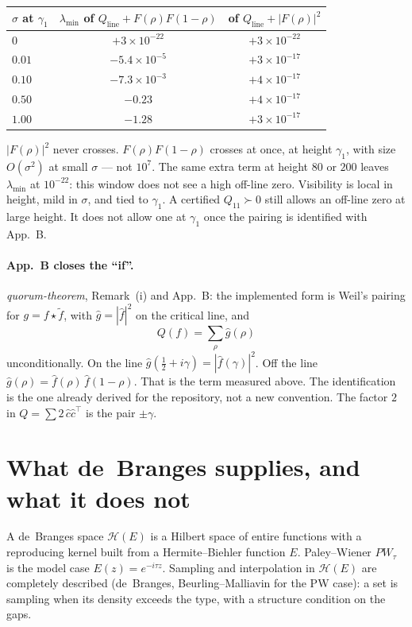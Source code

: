\documentclass[11pt]{article}
\theoremstyle{remark}\newtheorem*{remark}{Remark}
\begin{document}
\begin{center}\small
\begin{tabular}{lcc}\toprule
$\sigma$ at $\gamma_1$ & $\lambda_{\min}$ of $Q_{\mathrm{line}}+F(\rho)F(1-\rho)$
  & of $Q_{\mathrm{line}}+|F(\rho)|^2$\\
\midrule
$0$ & $+3\times10^{-22}$ & $+3\times10^{-22}$\\
$0.01$ & $-5.4\times10^{-5}$ & $+3\times10^{-17}$\\
$0.10$ & $-7.3\times10^{-3}$ & $+4\times10^{-17}$\\
$0.50$ & $-0.23$ & $+4\times10^{-17}$\\
$1.00$ & $-1.28$ & $+3\times10^{-17}$\\
\bottomrule
\end{tabular}
\end{center}
$|F(\rho)|^2$ never crosses. $F(\rho)F(1-\rho)$ crosses at once, at
height $\gamma_1$, with size $O(\sigma^2)$ at small $\sigma$ --- not
$10^7$. The same extra term at height $80$ or $200$ leaves
$\lambda_{\min}$ at $10^{-22}$: this window does not see a high
off-line zero. Visibility is local in height, mild in $\sigma$, and
tied to $\gamma_1$. A certified $Q_{11}\succ0$ still allows an off-line
zero at large height. It does not allow one at $\gamma_1$ once the
pairing is identified with App.~B.

\paragraph{App.~B closes the ``if''.}
\emph{quorum-theorem}, Remark~(i) and App.~B: the implemented form is
Weil's pairing for $g=f\star\tilde f$, with $\hat g=|\hat f|^2$ on the
critical line, and
\[
Q(f)=\sum_\rho\hat g(\rho)
\]
unconditionally. On the line $\hat g(\tfrac12+i\gamma)=|\hat f(\gamma)|^2$.
Off the line $\hat g(\rho)=\hat f(\rho)\,\hat f(1-\rho)$. That is the
term measured above. The identification is the one already derived
for the repository, not a new convention. The factor $2$ in
$Q=\sum 2\,\hat c\hat c^\top$ is the pair $\pm\gamma$.

\section{What de~Branges supplies, and what it does not}
A de~Branges space $\mathcal{H}(E)$ is a Hilbert space of entire
functions with a reproducing kernel built from a Hermite--Biehler
function $E$. Paley--Wiener $PW_\tau$ is the model case
$E(z)=e^{-i\tau z}$. Sampling and interpolation in $\mathcal{H}(E)$ are
completely described (de~Branges, Beurling--Malliavin for the
PW case): a set is sampling when its density exceeds the type, with a
structure condition on the gaps.
\end{document}
